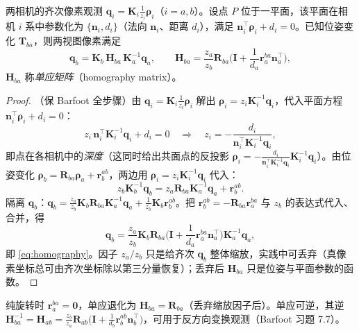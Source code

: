 \begin{theorem}[单应矩阵]\label{thm:homography}
两相机的齐次像素观测 $\mathbf{q}_i=\mathbf{K}_i\tfrac1{z_i}\boldsymbol\rho_i$（$i=a,b$）。设点 $P$ 位于一平面，该平面在相机 $i$ 系中参数化为 $\{\mathbf{n}_i,d_i\}$（法向 $\mathbf{n}_i$、距离 $d_i$），满足 $\mathbf{n}_i^\top\boldsymbol\rho_i+d_i=0$。已知位姿变化 $\mathbf{T}_{ba}$，则两视图像素满足
\begin{equation}
  \mathbf{q}_b=\mathbf{K}_b\,\mathbf{H}_{ba}\,\mathbf{K}_a^{-1}\mathbf{q}_a,\qquad
  \mathbf{H}_{ba}=\frac{z_a}{z_b}\mathbf{R}_{ba}\Big(\mathbf{I}+\frac1{d_a}\mathbf{r}_a^{ba}\mathbf{n}_a^\top\Big),
  \label{eq:homography}
\end{equation}
$\mathbf{H}_{ba}$ 称\emph{单应矩阵}（homography matrix）。
\end{theorem}
\begin{proof}
（保 Barfoot 全步骤\cite{barfoot2024state}）由 $\mathbf{q}_i=\mathbf{K}_i\tfrac1{z_i}\boldsymbol\rho_i$ 解出 $\boldsymbol\rho_i=z_i\mathbf{K}_i^{-1}\mathbf{q}_i$，代入平面方程 $\mathbf{n}_i^\top\boldsymbol\rho_i+d_i=0$：
\[
  z_i\,\mathbf{n}_i^\top\mathbf{K}_i^{-1}\mathbf{q}_i+d_i=0
  \quad\Longrightarrow\quad
  z_i=-\frac{d_i}{\mathbf{n}_i^\top\mathbf{K}_i^{-1}\mathbf{q}_i},
\]
即点在各相机中的\emph{深度}（这同时给出共面点的反投影 $\boldsymbol\rho_i=-\tfrac{d_i}{\mathbf{n}_i^\top\mathbf{K}_i^{-1}\mathbf{q}_i}\mathbf{K}_i^{-1}\mathbf{q}_i$）。由位姿变化 $\boldsymbol\rho_b=\mathbf{R}_{ba}\boldsymbol\rho_a+\mathbf{r}_b^{ab}$，两边用 $\boldsymbol\rho_i=z_i\mathbf{K}_i^{-1}\mathbf{q}_i$ 代入：
\[
  z_b\mathbf{K}_b^{-1}\mathbf{q}_b=z_a\mathbf{R}_{ba}\mathbf{K}_a^{-1}\mathbf{q}_a+\mathbf{r}_b^{ab}.
\]
隔离 $\mathbf{q}_b$：$\mathbf{q}_b=\tfrac{z_a}{z_b}\mathbf{K}_b\mathbf{R}_{ba}\mathbf{K}_a^{-1}\mathbf{q}_a+\tfrac1{z_b}\mathbf{K}_b\mathbf{r}_b^{ab}$。把 $\mathbf{r}_b^{ab}=-\mathbf{R}_{ba}\mathbf{r}_a^{ba}$ 与 $z_b$ 的表达式代入、合并，得
\[
  \mathbf{q}_b=\frac{z_a}{z_b}\mathbf{K}_b\mathbf{R}_{ba}\Big(\mathbf{I}+\frac1{d_a}\mathbf{r}_a^{ba}\mathbf{n}_a^\top\Big)\mathbf{K}_a^{-1}\mathbf{q}_a,
\]
即 \cref{eq:homography}。因子 $z_a/z_b$ 只是给齐次 $\mathbf{q}_b$ 整体缩放，实践中可丢弃（真像素坐标总可由齐次坐标除以第三分量恢复）；丢弃后 $\mathbf{H}_{ba}$ 只是位姿与平面参数的函数。
\end{proof}

\begin{corollary}[纯旋转特例与单应的逆]\label{cor:homography}
纯旋转时 $\mathbf{r}_a^{ba}=\mathbf{0}$，单应退化为 $\mathbf{H}_{ba}=\mathbf{R}_{ba}$（丢弃缩放因子后）。单应可逆，其逆 $\mathbf{H}_{ba}^{-1}=\mathbf{H}_{ab}=\tfrac{z_b}{z_a}\mathbf{R}_{ab}\big(\mathbf{I}+\tfrac1{d_b}\mathbf{r}_b^{ab}\mathbf{n}_b^\top\big)$，可用于反方向变换观测（Barfoot 习题 7.7\cite{barfoot2024state}）。
\end{corollary}

